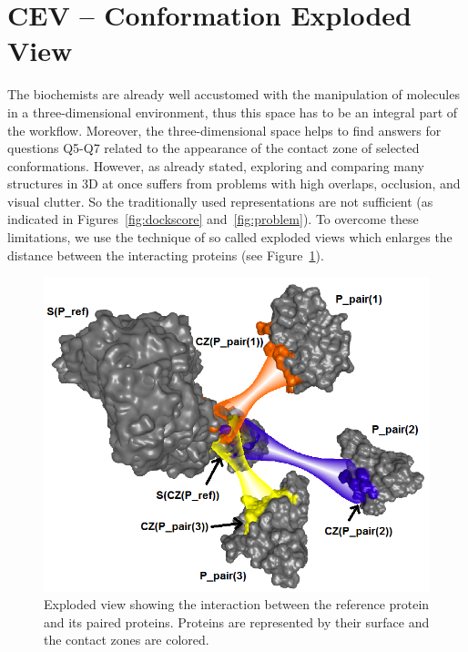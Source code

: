 \documentclass[journal]{vgtc}                %
\begin{document}
\section{CEV -- Conformation Exploded View}
The biochemists are already well accustomed with the manipulation of molecules in a three-dimensional environment, thus this space has to be an integral part of the workflow.
Moreover, the three-dimensional space helps to find answers for questions Q5-Q7 related to the appearance of the contact zone of selected conformations.
However, as already stated, exploring and comparing many structures in 3D at once suffers from problems with high overlaps, occlusion, and visual clutter. 
So the traditionally used representations are not sufficient (as indicated in Figures~\ref{fig:dockscore} and~\ref{fig:problem}).
To overcome these limitations, we use the technique of so called exploded views which enlarges the distance between the interacting proteins (see Figure~\ref{fig:exploded}). 

\begin{figure}[bt]
  \centering
  \includegraphics[width=1.0\columnwidth]{exploded.png}
  \caption{Exploded view showing the interaction between the reference protein and its paired proteins. Proteins are represented by their surface and the contact zones are colored.}
  \label{fig:exploded}
\end{figure}
\end{document}
